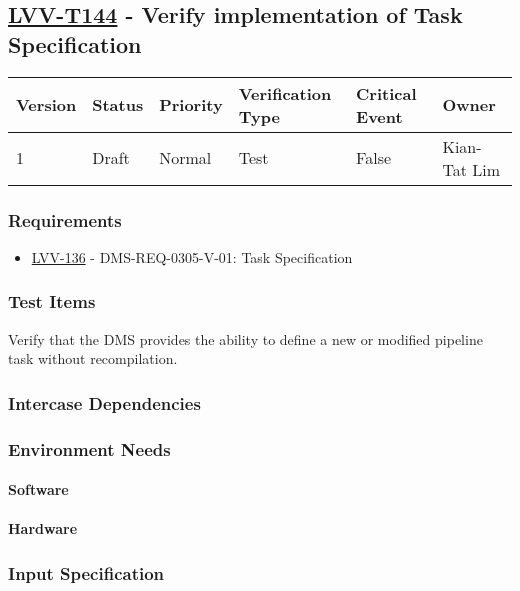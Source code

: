\subsection{\href{https://jira.lsstcorp.org/secure/Tests.jspa\#/testCase/LVV-T144}{LVV-T144}
    - Verify implementation of Task Specification}\label{lvv-t144}

\begin{longtable}[]{llllll}
\toprule
Version & Status & Priority & Verification Type & Critical Event & Owner
\\\midrule
1 & Draft & Normal &
Test & False & Kian-Tat Lim
\\\bottomrule
\end{longtable}

\subsubsection{Requirements}
\begin{itemize}
\item \href{https://jira.lsstcorp.org/browse/LVV-136}{LVV-136} - DMS-REQ-0305-V-01: Task Specification
\end{itemize}

\subsubsection{Test Items}
Verify that the DMS provides the ability to define a new or modified
pipeline task without recompilation.



\subsubsection{Intercase Dependencies}

\subsubsection{Environment Needs}

\paragraph{Software}

\paragraph{Hardware}

\subsubsection{Input Specification}

